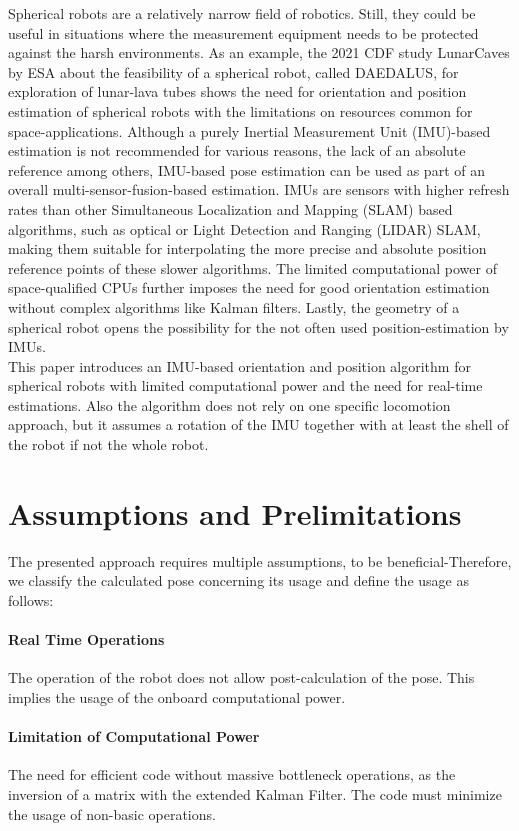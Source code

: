 \documentclass[letterpaper, 10 pt, conference]{ieeeconf}  %
\begin{document}
Spherical robots are a relatively narrow field of robotics. Still, they could be useful in situations where the measurement equipment needs to be protected against the harsh environments.
As an example, the 2021 CDF study LunarCaves by ESA about the feasibility of a spherical robot, called DAEDALUS, for exploration of lunar-lava tubes \cite{c2} shows the need for orientation and position estimation of spherical robots with the limitations on resources common for space-applications.
Although a purely Inertial Measurement Unit (IMU)-based estimation is not recommended for various reasons, the lack of an absolute reference among others, IMU-based pose estimation can be used as part of an overall multi-sensor-fusion-based estimation.
IMUs are sensors with higher refresh rates than other Simultaneous Localization and Mapping (SLAM) based algorithms, such as optical or Light Detection and Ranging (LIDAR) SLAM, making them suitable for interpolating the more precise and absolute position reference points of these slower algorithms.
The limited computational power of space-qualified CPUs further imposes the need for good orientation estimation without complex algorithms like Kalman filters.
Lastly, the geometry of a spherical robot opens the possibility for the not often used position-estimation by IMUs. \\
This paper introduces an IMU-based orientation and position algorithm for spherical robots with limited computational power and the need for real-time estimations.
Also the algorithm  does not rely on one specific locomotion approach, but it assumes a rotation of the IMU together with at least the shell of the robot if not the whole robot. 

\section{Assumptions and Prelimitations}
\label{AssumptionsAndPrelimitations}
The presented approach requires multiple assumptions, to be beneficial-Therefore, we classify the calculated pose concerning its usage and define the usage as follows:

\paragraph*{Real Time Operations}The operation of the robot does not allow post-calculation of the pose. This implies the usage of the onboard computational power.
\paragraph*{Limitation of Computational Power}
The need for efficient code without massive bottleneck operations, as the inversion of a  matrix with the extended Kalman Filter. The code must minimize the usage of non-basic operations.
\end{document}
